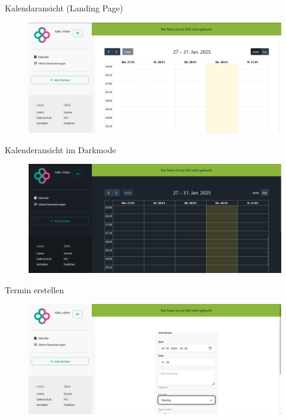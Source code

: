 \begin{frame}{Kalendaransicht (Landing Page)}
    \thispagestyle{plain}
    \begin{figure}
        \centering
        \includegraphics[width=1\linewidth]{pictures/calendar.png}
        \label{fig:enter-label}
    \end{figure}
    
\end{frame}

\begin{frame}{Kalenderansicht im Darkmode}
    \thispagestyle{plain}
    \begin{figure}
        \centering
        \includegraphics[width=1\linewidth]{pictures/calendar_dark.png}
        \label{fig:enter-label}
    \end{figure}
\end{frame}

\begin{frame}{Termin erstellen}
    \thispagestyle{plain}
    \begin{figure}
        \centering
        \includegraphics[width=1\linewidth]{pictures/bookings_create_form_1.png}
        \label{fig:enter-label}
    \end{figure}
\end{frame}

